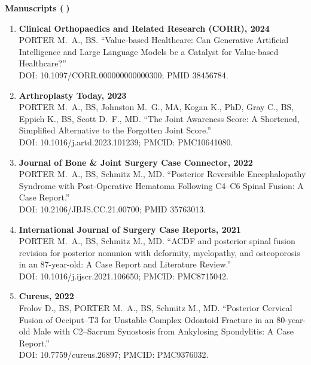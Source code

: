 \documentclass[9pt,a4paper]{article}
\newcommand{\emojiDoc}{{\emoji 📑}}
\begin{document}
\vspace{0.4em}
\textbf{Manuscripts (\emojiDoc)}
\begin{enumerate}[leftmargin=*]
  \item \textbf{Clinical Orthopaedics and Related Research (CORR), 2024}\\
  PORTER M.\ A., BS. ``Value-based Healthcare: Can Generative Artificial Intelligence and Large Language Models be a Catalyst for Value-based Healthcare?''\\
  DOI: 10.1097/CORR.000000000000300; PMID 38456784.

  \item \textbf{Arthroplasty Today, 2023}\\
  PORTER M.\ A., BS, Johnston M.\ G., MA, Kogan K., PhD, Gray C., BS, Eppich K., BS, Scott D.\ F., MD. ``The Joint Awareness Score: A Shortened, Simplified Alternative to the Forgotten Joint Score.''\\
  DOI: 10.1016/j.artd.2023.101239; PMCID: PMC10641080.

  \item \textbf{Journal of Bone \& Joint Surgery Case Connector, 2022}\\
  PORTER M.\ A., BS, Schmitz M., MD. ``Posterior Reversible Encephalopathy Syndrome with Post-Operative Hematoma Following C4--C6 Spinal Fusion: A Case Report.''\\
  DOI: 10.2106/JBJS.CC.21.00700; PMID 35763013.

  \item \textbf{International Journal of Surgery Case Reports, 2021}\\
  PORTER M.\ A., BS, Schmitz M., MD. ``ACDF and posterior spinal fusion revision for posterior nonunion with deformity, myelopathy, and osteoporosis in an 87-year-old: A Case Report and Literature Review.''\\
  DOI: 10.1016/j.ijscr.2021.106650; PMCID: PMC8715042.

  \item \textbf{Cureus, 2022}\\
  Frolov D., BS, PORTER M.\ A., BS, Schmitz M., MD. ``Posterior Cervical Fusion of Occiput--T3 for Unstable Complex Odontoid Fracture in an 80-year-old Male with C2--Sacrum Synostosis from Ankylosing Spondylitis: A Case Report.''\\
  DOI: 10.7759/cureus.26897; PMCID: PMC9376032.
\end{enumerate}
\end{document}
